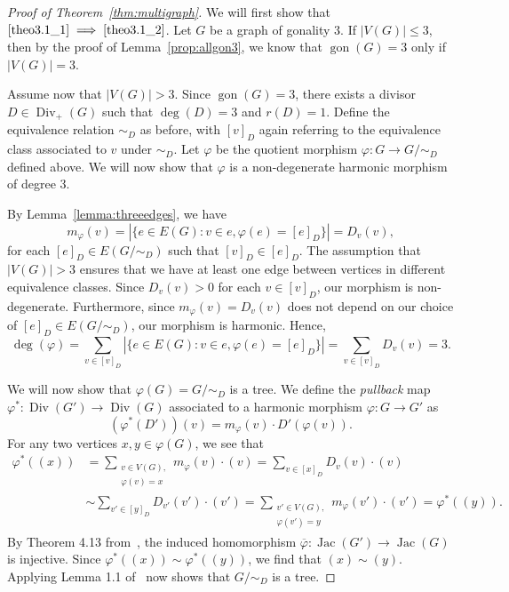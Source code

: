 \documentclass[10pt]{amsart}
\DeclareMathOperator{\gon}{gon}
\DeclareMathOperator{\Div}{Div}
\DeclareMathOperator{\Jac}{Jac}
\begin{document}
\begin{proof}[Proof of Theorem~\ref{thm:multigraph}]
We will first show that $\eqref{theo3.1_1} \implies \eqref{theo3.1_2}$. Let $G$ be a graph of gonality $3$. If $|V(G)| \leq 3$, then by the proof of Lemma~\ref{prop:allgon3}, we know that $\gon (G) = 3$ only if $|V(G)| = 3$. 

Assume now that $|V(G)| > 3$. Since $\gon (G)=3$, there exists a divisor $D \in \Div _+(G)$ such that $\deg (D) = 3$ and $r(D) = 1$. Define the equivalence relation $\sim_D$ as before, with $[v]_D$ again referring to the equivalence class associated to $v$ under $\sim_D$. Let $\varphi$ be the quotient morphism $\varphi : G \to G / \sim_D$ defined above. We will now show that $\varphi$ is a non-degenerate harmonic morphism of degree $3$.

By Lemma~\ref{lemma:threeedges}, we have
\[
m_\varphi(v) = | \{ e \in E(G) : v \in e, \varphi(e) = [e]_D \} | = D_{v}(v),
\]
for each $[e]_D \in E(G/\sim_D)$ such that $[v]_D \in [e]_D$. The assumption that $|V(G)| > 3$ ensures that we have at least one edge between vertices in different equivalence classes. Since $D_{v}(v) > 0$ for each $v \in [v]_D$, our morphism is non-degenerate. Furthermore, since $m_\varphi(v) = D_v(v)$ does not depend on our choice of $[e]_D \in E(G/\sim_D)$, our morphism is harmonic. Hence, 
\[
\deg (\varphi) = \sum_{v \in [v]_D} |\{ e \in E(G) : v \in e, \varphi(e) = [e]_D \}| = \sum_{v \in [v]_D} D_{v}(v) = 3.
\]



We will now show that $\varphi(G) = G / \sim_D$ is a tree. We define the \emph{pullback} map $\varphi^* : \Div (G') \to \Div (G)$ associated to a harmonic morphism $\varphi : G \to G'$ as
\[
(\varphi^*(D'))(v) = m_{\varphi}(v) \cdot D'(\varphi(v)).
\]
For any two vertices $x, y \in \varphi(G)$, we see that
\begin{align*}
 \varphi^*((x)) &= \sum_{\substack{v \in V(G), \\ \varphi(v) = x}} m_\varphi(v) \cdot (v) 
 = \sum_{v \in [x]_D} D_{v}(v) \cdot (v) 
 \\&\sim \sum_{v' \in [y]_D} D_{v'}(v') \cdot (v') 
 = \sum_{\substack{v' \in V(G), \\ \varphi(v') = y}} m_\varphi(v') \cdot (v') 
 = \varphi^*((y)).
\end{align*}
By Theorem 4.13 from~\cite{bn2}, the induced homomorphism $\overline{\varphi} : \Jac (G') \to \Jac (G)$ is injective. Since $\varphi^*((x)) \sim \varphi^*((y))$, we find that $(x) \sim (y)$. Applying Lemma 1.1 of~\cite{bn2} now shows that $G / \sim_D$ is a tree.


\end{proof}
\end{document}
